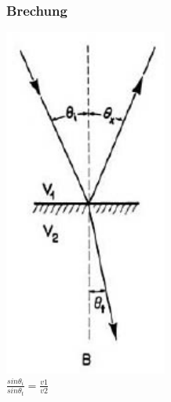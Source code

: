\begin{minipage}{0.2\textwidth}
    \subsubsection{Brechung}
    \includegraphics[width=0.4\textwidth]{images/Brechung}\\
    $\frac{sin \theta _{i}}{sin \theta _{t}} = \frac{v1}{v2}$\\\\\\\\\\\\
\end{minipage}
\hfill
